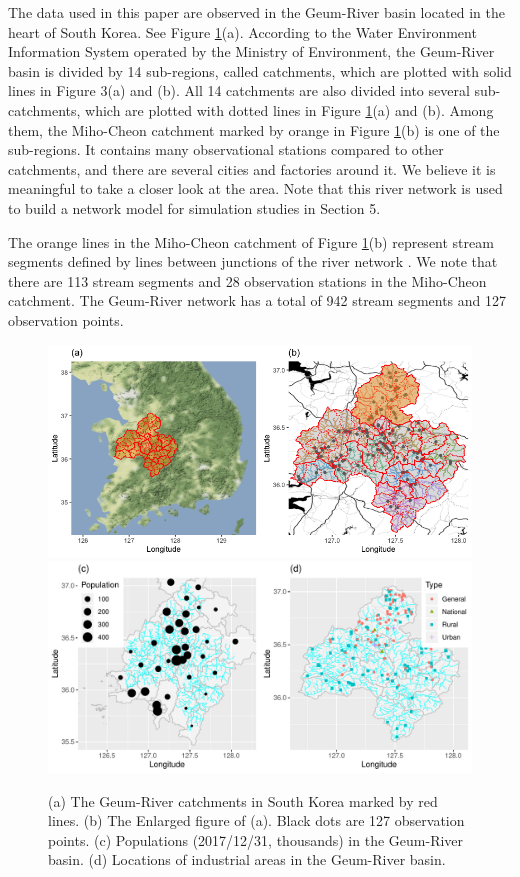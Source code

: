 \documentclass[11pt,titlepage]{article}
\begin{document}
The data used in this paper are observed in the Geum-River basin located in the heart of South Korea. See Figure \ref{fig:studyarea}(a). According to the Water Environment Information System operated by the Ministry of Environment, the Geum-River basin is divided by 14 sub-regions, called catchments, which are plotted with solid lines in Figure 3(a) and (b). All 14 catchments are also divided into several sub-catchments, which are plotted with dotted lines in Figure \ref{fig:studyarea}(a) and (b). Among them, the Miho-Cheon catchment marked by orange in Figure \ref{fig:studyarea}(b) is one of the sub-regions. It contains many observational stations compared to other catchments, and there are several cities and factories around it. We believe it is meaningful to take a closer look at the area. Note that this river network is used to build a network model for simulation studies in Section 5. 

The orange lines in the Miho-Cheon catchment of Figure \ref{fig:studyarea}(b) represent stream segments defined by lines between junctions of the river network \citep{VerHoef(2006), VerHoef(2010)}. We note that there are 113 stream segments and 28 observation stations in the Miho-Cheon catchment. The Geum-River network has a total of 942 stream segments and 127 observation points. 

\begin{figure}[!th]
	\centering\includegraphics[width=\textwidth]{Stream_result/Studyarea_small.png}
	\includegraphics[width=\textwidth]{Stream_result/Studyarea_additional.pdf}\caption{(a) The Geum-River catchments in South Korea marked by red lines. (b) The Enlarged figure of (a). Black dots are 127 observation points. (c) Populations (2017/12/31, thousands) in the Geum-River basin. (d) Locations of industrial areas in the Geum-River basin.}
	\label{fig:studyarea}
\end{figure}
\end{document}
